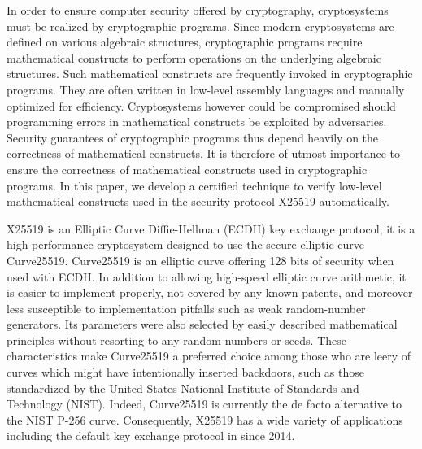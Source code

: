 
In order to ensure computer security offered by cryptography,
cryptosystems must be realized by cryptographic programs. Since modern
cryptosystems are defined on various algebraic structures,
cryptographic programs require mathematical constructs to perform
operations on the underlying algebraic structures.
Such mathematical constructs are frequently invoked in cryptographic
programs. They are often written in low-level assembly languages and
manually optimized for efficiency. 
Cryptosystems however could be compromised should programming
errors in mathematical constructs be exploited by adversaries.
Security guarantees of cryptographic programs
thus depend heavily on the correctness of mathematical constructs.
It is therefore of utmost importance to ensure the correctness of
mathematical constructs used in cryptographic programs. In this paper,
we develop a certified technique to verify low-level
mathematical constructs used in the security protocol X25519
automatically.

X25519 is an Elliptic Curve Diffie-Hellman (ECDH) key exchange
protocol; it is a high-performance cryptosystem designed to 
use the secure elliptic curve Curve25519. Curve25519 is an elliptic
curve offering 128 bits of security when used with ECDH. In addition
to allowing high-speed elliptic curve arithmetic, it is easier to
implement properly, not covered by any known patents, and moreover
less susceptible to implementation pitfalls such as weak 
random-number generators. Its parameters were also selected by
easily described mathematical principles without resorting to any
random numbers or seeds. These characteristics make Curve25519 a
preferred choice among those who are leery of curves which might have
intentionally inserted
backdoors, such as those standardized by the United States National
Institute of Standards and Technology (NIST). 
Indeed, Curve25519 is currently the
de facto alternative to the NIST P-256 curve. Consequently, X25519 has
a wide variety of applications including the default key exchange
protocol in \openssh since 2014.

